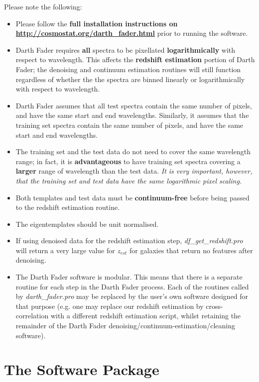 \documentclass[a4paper]{article}
\begin{document}
Please note the following:
\begin{itemize}
\item Please follow the {\bf full installation instructions on \url{http://cosmostat.org/darth_fader.html}} prior to running the software. 
\item Darth Fader requires {\bf all} spectra to be pixellated {\bf logarithmically} with respect to wavelength. This affects the {\bf redshift estimation} portion of Darth Fader; the denoising and continuum estimation routines will still function regardless of whether the the spectra are binned linearly or logarithmically with respect to wavelength.
\item Darth Fader assumes that all test spectra contain the same number of pixels, and have the same start and end wavelengths. Similarly, it assumes that the training set spectra contain the same number of pixels, and have the same start and end wavelengths. 
\item The training set and the test data do not need to cover the same wavelength range; in fact, it is {\bf advantageous} to have training set spectra covering a {\bf larger} range of wavelength than the test data. {\em It is very important, however, that the training set and test data have the same logarithmic pixel scaling.}
\item Both templates and test data must be {\bf continuum-free} before being passed to the redshift estimation routine. 
\item The eigentemplates should be unit normalised.
\item If using denoised data for the redshift estimation step, {\em df\_get\_redshift.pro} will return a very large value for $z_{est}$ for galaxies that return no features after denoising. 
\item The Darth Fader software is modular. This means that there is a separate routine for each step in the Darth Fader process. Each of the routines called by {\em darth\_fader.pro} may be replaced by the user's own software designed for that purpose (e.g. one may replace our redshift estimation by cross-correlation with a different redshift estimation script, whilst retaining the remainder of the Darth Fader denoising/continuum-estimation/cleaning software). 
\end{itemize}

\section{The Software Package}
\end{document}
